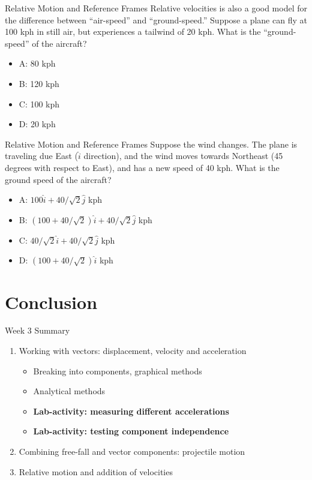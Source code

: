 \documentclass{beamer}
\begin{document}
\begin{frame}{Relative Motion and Reference Frames}
\small
Relative velocities is also a good model for the difference between ``air-speed'' and ``ground-speed.''  Suppose a plane can fly at 100 kph in still air, but experiences a tailwind of 20 kph.  What is the ``ground-speed'' of the aircraft?
\begin{itemize}
\item A: 80 kph
\item B: 120 kph
\item C: 100 kph
\item D: 20 kph
\end{itemize}
\end{frame}

\begin{frame}{Relative Motion and Reference Frames}
\small
Suppose the wind changes.  The plane is traveling due East ($\hat{i}$ direction), and the wind moves towards Northeast (45 degrees with respect to East), and has a new speed of 40 kph.  What is the ground speed of the aircraft?
\begin{itemize}
\item A: $100\hat{i} + 40/\sqrt{2}\hat{j}$  kph
\item B: $(100+40/\sqrt{2})\hat{i} + 40/\sqrt{2}\hat{j}$  kph
\item C: $40/\sqrt{2}\hat{i} + 40/\sqrt{2}\hat{j}$  kph
\item D: $(100+40/\sqrt{2})\hat{i}$  kph
\end{itemize}
\end{frame}

\section{Conclusion}

\begin{frame}{Week 3 Summary}
\begin{enumerate}
\item Working with vectors: displacement, velocity and acceleration
\begin{itemize}
\item Breaking into components, graphical methods
\item Analytical methods
\item \textbf{Lab-activity: measuring different accelerations}
\item \textbf{Lab-activity: testing component independence}
\end{itemize}
\item Combining free-fall and vector components: \alert{projectile motion}
\item Relative motion and addition of velocities
\end{enumerate}
\end{frame}
\end{document}
